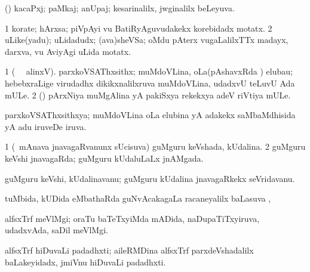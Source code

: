 {\bentry
{} 
\gl{\gu}
\expl{}
\bmng
(\savi) kacaPxj; paMkaj; anUpaj; kesarinalilx, jwginalilx beLeyuva. 
\emng
\eentry

\bentry
{} 
\gl{\gu}
\expl{}
\bmng
{} 
\emng
\eentry

\bentry
{} 
\gl{\nA}
\expl{}
\bmng
\bnum
\num{1} korate; hArxsa; piVpAyi \mo vu BatiRyAguvudakekx korebidadx motatx. 
\num{2} uLike(yadu); uLidadudx; (ava)sheVSa; oMdu pAterx \mo vugaLalilxTTx madayx, darxva, \mo vu AviyAgi uLida motatx. 
\enum
\emng
\eentry

\bentry
{} 
\gl{\nA}
\bmng
\bnum
\num{1} (\bava\  \ucAcx\ alinxV). parxkoVSAThxsithx; muMdoVLina, oLa(pAshavxRda ) elubau; hebebxraLige virudadhx dikikxnalilxruva muMdoVLina, udadxvU teLuvU Ada mULe. 
\num{2} (\pArxvi) pArxNiya muMgAlina yA pakiSxya rekekxya adeV riVtiya mULe. 
\enum
\emng
\eentry

\bentry
{} 
\gl{\gu}
\expl{}
\bmng
parxkoVSAThxsithxya; muMdoVLina oLa elubina yA adakekx saMbaMdhisida yA adu iruveDe iruva. 
\emng
\eentry

\bentry
{} 
\gl{\gu}
\expl{}
\bmng
\bnum
\num{1} (\kanmu\ mAnava jnavagaRvanunx sUcisuva) guMguru keVshada, kUdalina. 
\num{2} guMguru keVshi jnavagaRda; guMguru kUdaluLaLx jnAMgada. 
\enum
\emng
\eentry

\bentry
{} 
\gl{\nA}
\expl{}
\bmng
guMguru keVshi, kUdalinavanu; guMguru kUdalina jnavagaRkekx seVridavanu. 
\emng
\eentry

\bentry
{} 
\gl{\gu}
\expl{}
\bmng
{} 
\emng
\eentry

\bentry
{} 
\gl{\uparx}
\expl{}
\bmng
tuMbida, kUDida eMbathaRda guNvAcakagaLa racaneyalilx baLasuva \uparx, \udA\  
\emng
\eentry

\bentry
{} 
\gl{\nA}
\expl{}
\bmng
alfsxTrf meVlMgi; oraTu baTeTxyiMda mADida, naDupaTiTxyiruva, udadxvAda, saDil meVlMgi. 
\emng
\eentry

\bentry
{} 
\gl{\nA}
\expl{}
\bmng
alfsxTrf hiDuvaLi padadhxti; aileRMDina alfsxTrf parxdeVshadalilx baLakeyidadx, jmiVnu hiDuvaLi padadhxti. 
\emng
\eentry

}
